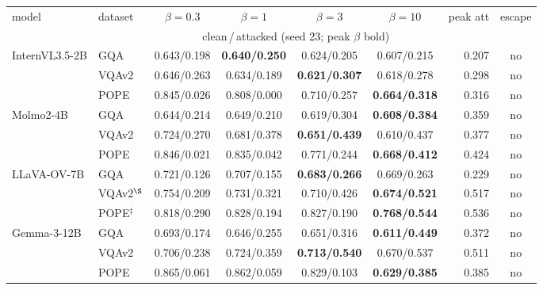 \small
\setlength{\tabcolsep}{4pt}
\begin{tabular}{@{}ll cccc r c@{}}
\toprule
model & dataset & $\beta{=}0.3$ & $\beta{=}1$ & $\beta{=}3$ & $\beta{=}10$ & peak att & escape \\
 &  & \multicolumn{4}{c}{clean\,/\,attacked (seed 23; peak $\beta$ bold)} &  &  \\
\midrule
\multirow{3}{*}{InternVL3.5-2B} & GQA & 0.643/0.198 & \textbf{0.640/0.250} & 0.624/0.205 & 0.607/0.215 & 0.207 & no \\
 & VQAv2 & 0.646/0.263 & 0.634/0.189 & \textbf{0.621/0.307} & 0.618/0.278 & 0.298 & no \\
 & POPE & 0.845/0.026 & 0.808/0.000 & 0.710/0.257 & \textbf{0.664/0.318} & 0.316 & no \\
\midrule
\multirow{3}{*}{Molmo2-4B} & GQA & 0.644/0.214 & 0.649/0.210 & 0.619/0.304 & \textbf{0.608/0.384} & 0.359 & no \\
 & VQAv2 & 0.724/0.270 & 0.681/0.378 & \textbf{0.651/0.439} & 0.610/0.437 & 0.377 & no \\
 & POPE & 0.846/0.021 & 0.835/0.042 & 0.771/0.244 & \textbf{0.668/0.412} & 0.424 & no \\
\midrule
\multirow{3}{*}{LLaVA-OV-7B} & GQA & 0.721/0.126 & 0.707/0.155 & \textbf{0.683/0.266} & 0.669/0.263 & 0.229 & no \\
 & VQAv2$^{\S}$ & 0.754/0.209 & 0.731/0.321 & 0.710/0.426 & \textbf{0.674/0.521} & 0.517 & no \\
 & POPE$^{\ddagger}$ & 0.818/0.290 & 0.828/0.194 & 0.827/0.190 & \textbf{0.768/0.544} & 0.536 & no \\
\midrule
\multirow{3}{*}{Gemma-3-12B} & GQA & 0.693/0.174 & 0.646/0.255 & 0.651/0.316 & \textbf{0.611/0.449} & 0.372 & no \\
 & VQAv2 & 0.706/0.238 & 0.724/0.359 & \textbf{0.713/0.540} & 0.670/0.537 & 0.511 & no \\
 & POPE & 0.865/0.061 & 0.862/0.059 & 0.829/0.103 & \textbf{0.629/0.385} & 0.385 & no \\
\bottomrule
\end{tabular}

\vspace{3pt}
